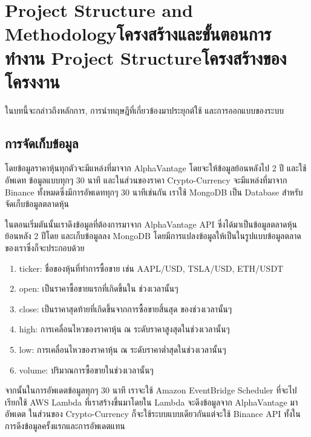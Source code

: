 \chapter{\ifproject%
      \ifenglish Project Structure and Methodology\else โครงสร้างและขั้นตอนการทำงาน\fi
  \else%
      \ifenglish Project Structure\else โครงสร้างของโครงงาน\fi
  \fi
 }

ในบทนี้จะกล่าวถึงหลักการ, การนำทฤษฎีที่เกี่ยวข้องมาประยุกต์ใช้ และการออกแบบของระบบ

\makeatletter


\makeatother

\section{การจัดเก็บข้อมูล}
โดยข้อมูลราคาหุ้นทุกตัวจะมีแหล่งที่มาจาก AlphaVantage โดยจะให้ข้อมูลย้อนหลังไป 2 ปี และใช้อัพเดท
ข้อมูลแบบทุกๆ 30 นาที และในส่วนของราคา Crypto-Currency จะมีแหล่งที่มาจาก Binance ทั้งหมดซึ่งมีการอัพเดททุกๆ 30 นาทีเช่นกัน
เราใช้ MongoDB เป็น Database สำหรับจัดเก็บข้อมูลตลาดหุ้น

ในตอนเริ่มตันนั้นเราดึงข้อมูลที่ต้องการมาจาก AlphaVantage API ซึ่งได้มาเป็นข้อมูลตลาดหุ้นย้อนหลัง 2 ปีโดย
และเก็บข้อมูลลง MongoDB โดยมีการแปลงข้อมูลให้เป็นในรูปแบบข้อมูลตลาดของเราซึ่งก็จะประกอบด้วย
\begin{enumerate}
    \item ticker: ชื่อของหุ้นที่ทำการซื้อขาย เช่น AAPL/USD, TSLA/USD, ETH/USDT
    \item open: เป็นราคาซื้อขายแรกที่เกิดขึ้นใน ช่วงเวลานั้นๆ
    \item close: เป็นราคาสุดท้ายที่เกิดขึ้นจากการซื้อขายสิ้นสุด ของช่วงเวลานั้นๆ
    \item high: การเคลื่อนไหวของราคาหุ้น ณ ระดับราคาสูงสุดในช่วงเวลานั้นๆ
    \item low: การเคลื่อนไหวของราคาหุ้น ณ ระดับราคาต่ำสุดในช่วงเวลานั้นๆ
    \item volume: ปริมาณการซื้อขายในช่วงเวลานั้นๆ
\end{enumerate}
จากนั้นในการอัพเดตข้อมูลทุกๆ 30 นาที เราจะใช้ Amazon EventBridge Scheduler ที่จะไปเรียกใช้ AWS Lambda ที่เราสร้างขึ้นมาโดยใน Lambda จะดึงข้อมูลจาก
AlphaVantage มาอัพเดต ในส่วนของ Crypto-Currency ก็จะใช้ระบบแบบเดียวกันแต่จะใช้ Binance API ทั้งในการดึงข้อมูลครั้งแรกและการอัพเดตแทน


